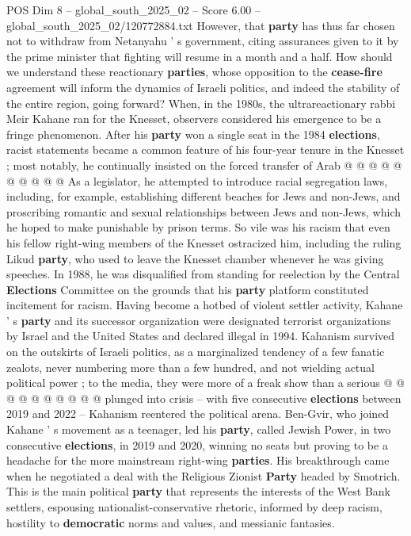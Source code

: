 \begin{textsample}{POS Dim 8 – global\_south\_2025\_02 – Score 6.00 – global\_south\_2025\_02/120772884.txt}
However, that \textbf{party} has thus far chosen not to withdraw from Netanyahu ' s government, citing assurances given to it by the prime minister that fighting will resume in a month and a half.
How should we understand these reactionary \textbf{parties}, whose opposition to the \textbf{cease-fire} agreement will inform the dynamics of Israeli politics, and indeed the stability of the entire region, going forward?
When, in the 1980s, the ultrareactionary rabbi Meir Kahane ran for the Knesset, observers considered his emergence to be a fringe phenomenon.
After his \textbf{party} won a single seat in the 1984 \textbf{elections}, racist statements became a common feature of his four-year tenure in the Knesset ; most notably, he continually insisted on the forced transfer of Arab @ @ @ @ @ @ @ @ @ @ As a legislator, he attempted to introduce racial segregation laws, including, for example, establishing different beaches for Jews and non-Jews, and proscribing romantic and sexual relationships between Jews and non-Jews, which he hoped to make punishable by prison terms.
So vile was his racism that even his fellow right-wing members of the Knesset ostracized him, including the ruling Likud \textbf{party}, who used to leave the Knesset chamber whenever he was giving speeches.
In 1988, he was disqualified from standing for reelection by the Central \textbf{Elections} Committee on the grounds that his \textbf{party} platform constituted incitement for racism.
Having become a hotbed of violent settler activity, Kahane ' s \textbf{party} and its successor organization were designated terrorist organizations by Israel and the United States and declared illegal in 1994.
Kahanism survived on the outskirts of Israeli politics, as a marginalized tendency of a few fanatic zealots, never numbering more than a few hundred, and not wielding actual political power ; to the media, they were more of a freak show than a serious @ @ @ @ @ @ @ @ @ @ plunged into crisis -- with five consecutive \textbf{elections} between 2019 and 2022 -- Kahanism reentered the political arena.
Ben-Gvir, who joined Kahane ' s movement as a teenager, led his \textbf{party}, called Jewish Power, in two consecutive \textbf{elections}, in 2019 and 2020, winning no seats but proving to be a headache for the more mainstream right-wing \textbf{parties}.
His breakthrough came when he negotiated a deal with the Religious Zionist \textbf{Party} headed by Smotrich.
This is the main political \textbf{party} that represents the interests of the West Bank settlers, espousing nationalist-conservative rhetoric, informed by deep racism, hostility to \textbf{democratic} norms and values, and messianic fantasies.

\end{textsample}
